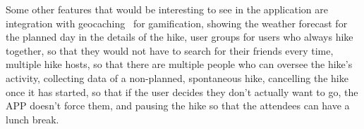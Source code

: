Some other features that would be interesting to see in the application are integration with geocaching~\cite{geocaching} for gamification,
showing the weather forecast for the planned day in the details of the hike,
user groups for users who always hike together, so that they would not have to search for their friends every time,
multiple hike hosts, so that there are multiple people who can oversee the hike's activity,
collecting data of a non-planned, spontaneous hike,
cancelling the hike once it has started, so that if the user decides they don't actually want to go, the APP doesn't force them,
and pausing the hike so that the attendees can have a lunch break.
